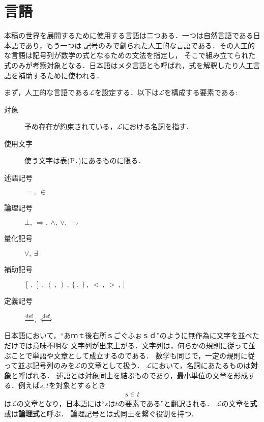 \section{言語}
	本稿の世界を展開するために使用する言語は二つある．一つは自然言語である日本語であり，もう一つは
	記号のみで創られた人工的な言語である．その人工的な言語は記号列が数学の式となるための文法を指定し，
	そこで組み立てられた式のみが考察対象となる．日本語はメタ言語とも呼ばれ，式を解釈したり人工言語を補助するために使われる．
	
	まず，人工的な言語である$\mathcal{L}$を設定する．以下は$\mathcal{L}$を構成する要素である:
	\begin{description}
		\item[対象] 予め存在が約束されている，$\mathcal{L}$における名詞を指す． 
		\item[使用文字] 使う文字は表(P．\pageref{tab:alphabet})にあるものに限る．
		\item[述語記号] $=,\ \in$
		\item[論理記号] $\bot,\ \Longrightarrow,\ \wedge,\ \vee,\ \rightharpoondown$
		\item[量化記号] $\forall,\ \exists$
		\item[補助記号] $[\ ,\ ]\ ,\ (\ ,\ )\ ,\ \{\ ,\ \}\ ,\ <\ ,\ >\ ,\ |$
		\item[定義記号] $\defeq,\ \defarrow$
	\end{description}
	
	日本語において，``あｍｔ後右所ｓごぐふぉｓｄ''のように無作為に文字を並べただけでは意味不明な
	文字列が出来上がる．文字列は，何らかの規則に従って並ぶことで単語や文章として成立するのである．
	数学も同じで，一定の規則に従って並ぶ記号列のみを$\mathcal{L}$の文章として扱う．
	$\mathcal{L}$において，名詞にあたるものは{\bf 対象}と呼ばれる．
	述語とは対象同士を結ぶものであり，最小単位の文章を形成する．例えば$s,t$を対象とするとき
	\begin{align}
		s \in t
	\end{align}
	は$\mathcal{L}$の文章となり，日本語には``$s$は$t$の要素である''と翻訳される．
	$\mathcal{L}$の文章を{\bf 式}或は{\bf 論理式}と呼ぶ．
	論理記号とは式同士を繋ぐ役割を持つ．
	
	
